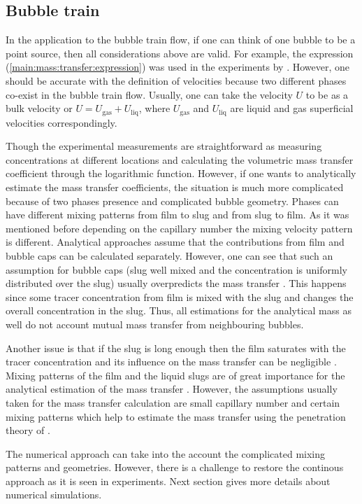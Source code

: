 \documentclass{article}
\newcommand{\uliq}{U_{\mathrm{liq}}}
\newcommand{\ugas}{U_{\mathrm{gas}}}
\begin{document}
\subsection{Bubble train}
In the application to the bubble train flow, if one can think of one bubble to be a point source,
then all considerations above are valid. For example, the expression
(\ref{main:mass:transfer:expression}) was used in the experiments by
\citet{bercic-mass}. However, one should be accurate with the definition of velocities because two
different phases co-exist in the bubble train flow. Usually, one can take the velocity $U$ to be as
a bulk velocity or $U=\ugas+\uliq$, where $\ugas$ and $\uliq$ are liquid and gas
superficial velocities correspondingly. 

Though the experimental measurements are straightforward as measuring concentrations at different
locations and calculating the volumetric mass transfer coefficient through the logarithmic
function. However, if one wants to analytically estimate the mass transfer coefficients, the
situation is much more complicated because of two phases presence and complicated bubble
geometry. Phases can have different mixing patterns
from film to slug and from slug to film. As it was mentioned before depending on the capillary
number the mixing velocity pattern is different. Analytical approaches
\cite{irandoust,vanbaten-circular} assume that the
contributions from film and bubble caps can be calculated separately. However, one can see that
such 
an assumption for bubble caps (slug well mixed and the concentration is uniformly distributed over
the slug) usually overpredicts the mass transfer \cite{irandoust}. This happens since some tracer
concentration from film is mixed with the slug and changes the overall concentration in the slug.
Thus, all estimations for the analytical mass as well do not account mutual mass transfer from
neighbouring bubbles.

Another issue is that if the slug is long enough then the film saturates with the tracer
concentration and its influence on the mass transfer can be negligible \cite{vanbaten-circular}.
Mixing patterns of the film and the liquid slugs are of great importance for the analytical
estimation of the mass transfer \cite{yue-mass}. However, the assumptions usually taken for the
mass transfer calculation are small capillary number and certain mixing patterns which help to
estimate the mass transfer using the penetration theory of \citet{higbie}.

The numerical approach can take into the account the complicated mixing patterns and geometries.
However, there is a  challenge to restore the continous approach as it is seen in experiments. Next
section gives more details about numerical simulations.
 
\end{document}
